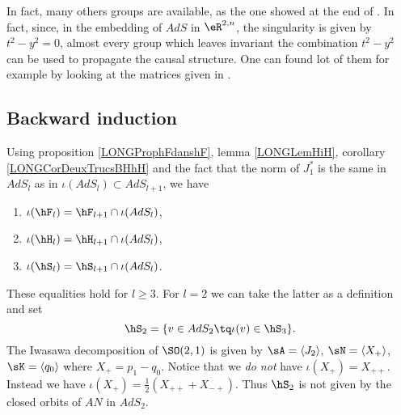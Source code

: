 In fact, many others groups are available, as the one showed at the end of \cite{BTZ_horizon}. In fact, since, in the embedding of $AdS$ in $\eR^{2,n}$, the singularity is given by $t^2-y^2=0$, almost every group which leaves invariant the combination $t^2-y^2$ can be used to propagate the causal structure. One can found lot of them for example by looking at the matrices given in \cite{These}.

%
\subsection{Backward induction}
%

Using proposition \ref{LONGProphFdanshF}, lemma \ref{LONGLemHiH}, corollary \ref{LONGCorDeuxTrucsBHhH} and the fact that the norm of $J_1^*$ is the same in $AdS_l$ as in $\iota(AdS_l)\subset AdS_{l+1}$, we have
\begin{enumerate}
    \item
        $\iota(\hF_l)=\hF_{l+1}\cap\iota(AdS_l)$,
    \item
        $\iota(\hH_l)=\hH_{l+1}\cap\iota(AdS_l)$,
    \item 
        $\iota(\hS_l)=\hS_{l+1}\cap\iota(AdS_l)$.
\end{enumerate}
These equalities hold for $l\geq 3$. For $l=2$ we can take the latter as a definition and set
\begin{equation}
    \hS_2=\{ v\in AdS_2\tq \iota(v)\in\hS_3 \}.
\end{equation}
The Iwasawa decomposition of $\SO(2,1)$ is given by $\sA=\langle J_2\rangle$, $\sN=\langle X_+\rangle$, $\sK=\langle q_0\rangle$ where $X_+=p_1-q_0$. Notice that we \emph{do not} have $\iota(X_+)=X_{++}$. Instead we have $\iota(X_+)=\frac{ 1 }{2}(X_{++}+X_{-+})$. Thus $\hS_2$ is not given by the closed orbits of $AN$ in $AdS_2$.

